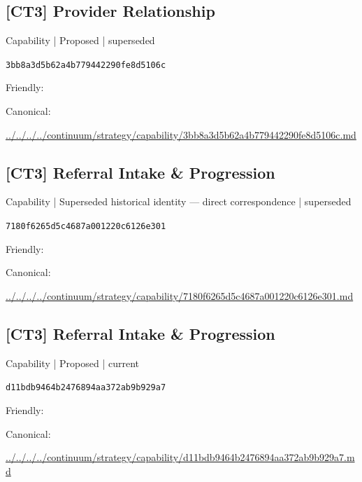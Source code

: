 \documentclass[10pt,a4paper]{article}
\begin{document}
\subsection*{[CT3] Provider Relationship}
{\small Capability | Proposed | superseded}\par
\texttt{3bb8a3d5b62a4b779442290fe8d5106c}\par
Friendly: \par
Canonical: \par
{\footnotesize\url{../../../../continuum/strategy/capability/3bb8a3d5b62a4b779442290fe8d5106c.md}}\par
\subsection*{[CT3] Referral Intake \& Progression}
{\small Capability | Superseded historical identity — direct correspondence | superseded}\par
\texttt{7180f6265d5c4687a001220c6126e301}\par
Friendly: \par
Canonical: \par
{\footnotesize\url{../../../../continuum/strategy/capability/7180f6265d5c4687a001220c6126e301.md}}\par
\subsection*{[CT3] Referral Intake \& Progression}
{\small Capability | Proposed | current}\par
\texttt{d11bdb9464b2476894aa372ab9b929a7}\par
Friendly: \par
Canonical: \par
{\footnotesize\url{../../../../continuum/strategy/capability/d11bdb9464b2476894aa372ab9b929a7.md}}\par
\end{document}
